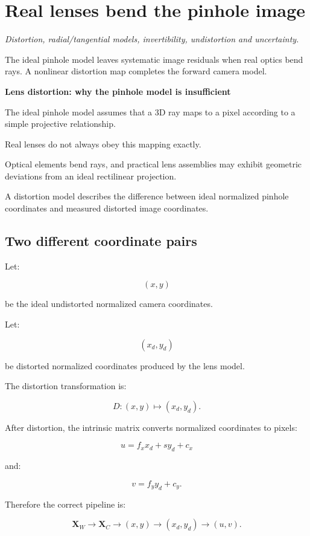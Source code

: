 \section{Real lenses bend the pinhole image}\label{02-foundations-ii-ch035-real-lenses-bend-the-pinhole-image}

\emph{Distortion, radial/tangential models, invertibility, undistortion and uncertainty.}

The ideal pinhole model leaves systematic image residuals when real optics bend rays. A nonlinear distortion map completes the forward camera model.

\textbf{Lens distortion: why the pinhole model is insufficient}

The ideal pinhole model assumes that a 3D ray maps to a pixel according to a simple projective relationship.

Real lenses do not always obey this mapping exactly.

Optical elements bend rays, and practical lens assemblies may exhibit geometric deviations from an ideal rectilinear projection.

A distortion model describes the difference between ideal normalized pinhole coordinates and measured distorted image coordinates.

\subsection{Two different coordinate pairs}\label{02-foundations-ii-ch035-two-different-coordinate-pairs}

Let:

\[
 (x,y)
\]

be the ideal undistorted normalized camera coordinates.

Let:

\[
 (x_d,y_d)
\]

be distorted normalized coordinates produced by the lens model.

The distortion transformation is:

\[
 \boxed{ D: (x,y)\mapsto(x_d,y_d) }.
\]

After distortion, the intrinsic matrix converts normalized coordinates to pixels:

\[
 \boxed{ u=f_xx_d+sy_d+c_x }
\]

and:

\[
 \boxed{ v=f_yy_d+c_y }.
\]

Therefore the correct pipeline is:

\[
 \boxed{ \mathbf X_W \rightarrow \mathbf X_C \rightarrow (x,y) \rightarrow (x_d,y_d) \rightarrow (u,v) }.
\]

